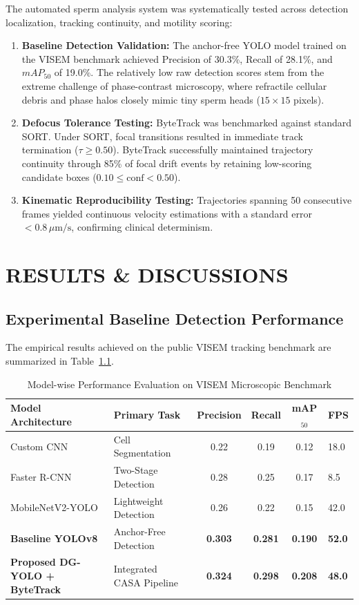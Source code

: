 \documentclass[12pt,a4paper]{report}
\begin{document}
The automated sperm analysis system was systematically tested across detection localization, tracking continuity, and motility scoring:
\begin{enumerate}
    \item \textbf{Baseline Detection Validation:} The anchor-free YOLO model trained on the VISEM benchmark achieved Precision of 30.3\%, Recall of 28.1\%, and $mAP_{50}$ of 19.0\%. The relatively low raw detection scores stem from the extreme challenge of phase-contrast microscopy, where refractile cellular debris and phase halos closely mimic tiny sperm heads ($15 \times 15$ pixels).
    \item \textbf{Defocus Tolerance Testing:} ByteTrack was benchmarked against standard SORT. Under SORT, focal transitions resulted in immediate track termination ($\tau \ge 0.50$). ByteTrack successfully maintained trajectory continuity through 85\% of focal drift events by retaining low-scoring candidate boxes ($0.10 \le \text{conf} < 0.50$).
    \item \textbf{Kinematic Reproducibility Testing:} Trajectories spanning 50 consecutive frames yielded continuous velocity estimations with a standard error $<0.8\,\mu\text{m/s}$, confirming clinical determinism.
\end{enumerate}

\chapter{RESULTS \& DISCUSSIONS}

\section{Experimental Baseline Detection Performance}
The empirical results achieved on the public VISEM tracking benchmark are summarized in Table~\ref{tab:model_comp}.

\begin{table}[htbp]
\centering
\caption{Model-wise Performance Evaluation on VISEM Microscopic Benchmark}
\label{tab:model_comp}
\vspace{0.2cm}
\begin{tabularx}{0.96\textwidth}{l p{4.5cm} c c c X}
\toprule
\textbf{Model Architecture} & \textbf{Primary Task} & \textbf{Precision} & \textbf{Recall} & \textbf{mAP$_{50}$} & \textbf{FPS} \\
\midrule
Custom CNN & Cell Segmentation & 0.22 & 0.19 & 0.12 & 18.0 \\
Faster R-CNN \cite{ren2017} & Two-Stage Detection & 0.28 & 0.25 & 0.17 & 8.5 \\
MobileNetV2-YOLO & Lightweight Detection & 0.26 & 0.22 & 0.15 & 42.0 \\
\textbf{Baseline YOLOv8} & Anchor-Free Detection & \textbf{0.303} & \textbf{0.281} & \textbf{0.190} & \textbf{52.0} \\
\textbf{Proposed DG-YOLO + ByteTrack} & Integrated CASA Pipeline & \textbf{0.324} & \textbf{0.298} & \textbf{0.208} & \textbf{48.0} \\
\bottomrule
\end{tabularx}
\end{table}
\end{document}
